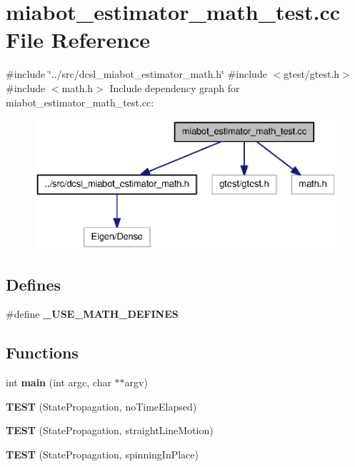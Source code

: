 \section{miabot\-\_\-estimator\-\_\-math\-\_\-test.\-cc \-File \-Reference}
\label{miabot__estimator__math__test_8cc}
{\ttfamily \#include \char`\"{}../src/dcsl\-\_\-miabot\-\_\-estimator\-\_\-math.\-h\char`\"{}}\*
{\ttfamily \#include $<$gtest/gtest.\-h$>$}\*
{\ttfamily \#include $<$math.\-h$>$}\*
\-Include dependency graph for miabot\-\_\-estimator\-\_\-math\-\_\-test.\-cc\-:
\nopagebreak
\begin{figure}[H]
\begin{center}
\leavevmode
\includegraphics[width=350pt]{miabot__estimator__math__test_8cc__incl}
\end{center}
\end{figure}
\subsection*{\-Defines}
\begin{DoxyCompactItemize}
\item 
\#define {\bf \-\_\-\-U\-S\-E\-\_\-\-M\-A\-T\-H\-\_\-\-D\-E\-F\-I\-N\-E\-S}
\end{DoxyCompactItemize}
\subsection*{\-Functions}
\begin{DoxyCompactItemize}
\item 
int {\bf main} (int argc, char $\ast$$\ast$argv)
\item 
{\bf \-T\-E\-S\-T} (\-State\-Propagation, no\-Time\-Elapsed)
\item 
{\bf \-T\-E\-S\-T} (\-State\-Propagation, straight\-Line\-Motion)
\item 
{\bf \-T\-E\-S\-T} (\-State\-Propagation, spinning\-In\-Place)
\end{DoxyCompactItemize}


